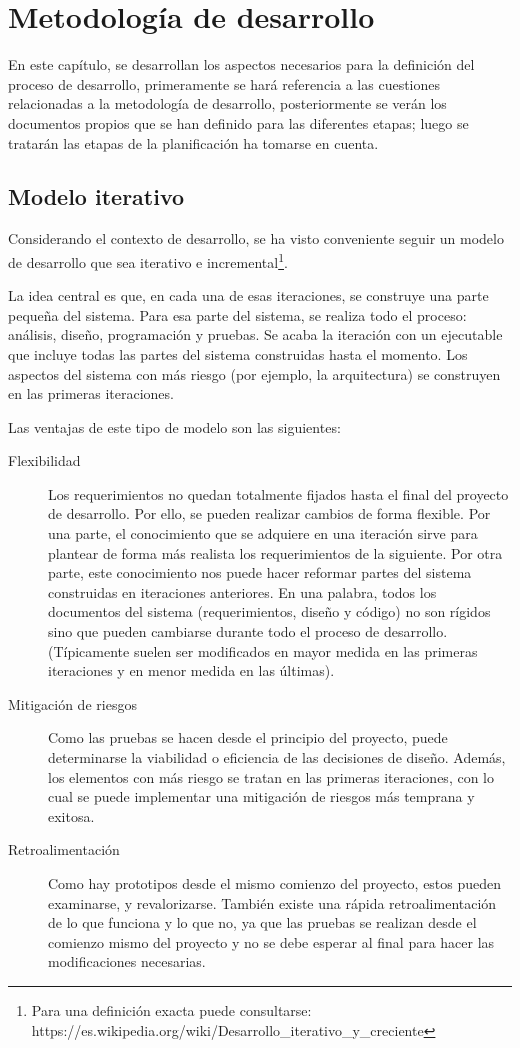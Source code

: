\chapter{Metodología de desarrollo}

En este capítulo, se desarrollan los aspectos necesarios para la definición del 
proceso de desarrollo, primeramente se hará referencia a las cuestiones 
relacionadas a la metodología de desarrollo, posteriormente se verán los
documentos propios que se han definido para las diferentes etapas; luego se
tratarán las etapas de la planificación ha tomarse en cuenta.

\section{Modelo iterativo}

Considerando el contexto de desarrollo, se ha visto conveniente seguir un modelo
de desarrollo que sea iterativo e incremental\footnote{Para una definición exacta
puede consultarse: https://es.wikipedia.org/wiki/Desarrollo\_iterativo\_y\_creciente}.

La idea central es que, en cada una de esas iteraciones, se construye una parte
pequeña del sistema. Para esa parte del sistema, se realiza todo el proceso:
análisis, diseño, programación y pruebas. Se acaba la iteración con un
ejecutable que incluye todas las partes del sistema construidas hasta el
momento. Los aspectos del sistema con más riesgo (por ejemplo, la arquitectura) 
se construyen en las primeras iteraciones.

Las ventajas de este tipo de modelo son las siguientes:
\begin{description}
\item [Flexibilidad] Los requerimientos no quedan totalmente fijados hasta el
final del proyecto de desarrollo. Por ello, se pueden realizar cambios de forma
flexible. Por una parte, el conocimiento que se adquiere en una iteración sirve
para plantear de forma más realista los requerimientos de la siguiente. Por
otra parte, este conocimiento nos puede hacer reformar partes del sistema
construidas en iteraciones anteriores. En una palabra, todos los documentos del
sistema (requerimientos, diseño y código) no son rígidos sino que pueden
cambiarse durante todo el proceso de desarrollo. (Típicamente suelen ser
modificados en mayor medida en las primeras iteraciones y en menor medida en
las últimas).
\item [Mitigación de riesgos] Como las pruebas se hacen desde el principio del
proyecto, puede determinarse la viabilidad o eficiencia de las decisiones de
diseño. Además, los elementos con más riesgo se tratan en las primeras
iteraciones, con lo cual se puede implementar una mitigación de riesgos más 
temprana y exitosa.
\item [Retroalimentación] Como hay prototipos desde el mismo comienzo del
proyecto, estos pueden examinarse, y revalorizarse. También existe una rápida
retroalimentación de lo que funciona y lo que no, ya que las pruebas se 
realizan desde el comienzo mismo del proyecto y no se debe esperar al final
para hacer las modificaciones necesarias.
\end{description}

